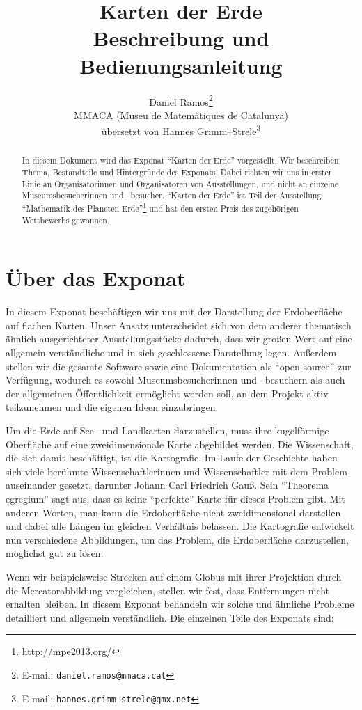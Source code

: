 \documentclass[a4paper,12pt]{article}
\title{Karten der Erde \\ Beschreibung und Bedienungsanleitung}
\author{Daniel Ramos\footnote{E-mail: \texttt{daniel.ramos@mmaca.cat}}
        \\MMACA (Museu de Matemàtiques de Catalunya)
        \\übersetzt von Hannes Grimm--Strele\footnote{E-mail: \texttt{hannes.grimm-strele@gmx.net}}}
\date{}
\begin{document}
\maketitle

\begin{abstract}
  In diesem Dokument wird das Exponat "`Karten der Erde"' vorgestellt.
  Wir beschreiben Thema, Bestandteile und Hintergründe des Exponats. 
  Dabei richten wir uns in erster Linie an Organisatorinnen und Organisatoren 
  von Ausstellungen, und nicht an einzelne Museumsbesucherinnen und --besucher. 
  "`Karten der Erde"' ist Teil der Ausstellung "`Mathematik des Planeten 
  Erde"'\footnote{\url{http://mpe2013.org/}} und hat den ersten Preis des 
  zugehörigen Wettbewerbs gewonnen.
\end{abstract}


\section{Über das Exponat}

In diesem Exponat beschäftigen wir uns mit der Darstellung der Erdoberfläche auf flachen 
Karten. Unser Ansatz unterscheidet sich von dem anderer thematisch ähnlich ausgerichteter
Ausstellungsstücke dadurch, dass wir großen Wert auf eine allgemein verständliche und 
in sich geschlossene Darstellung legen. Außerdem stellen wir die gesamte Software sowie 
eine Dokumentation als "`open source"' zur Verfügung, wodurch es sowohl 
Museumsbesucherinnen und --besuchern als auch der allgemeinen Öffentlichkeit ermöglicht 
werden soll, an dem Projekt aktiv teilzunehmen und die eigenen Ideen einzubringen.

Um die Erde auf See-- und Landkarten darzustellen, muss ihre kugelförmige Oberfläche 
auf eine zweidimensionale Karte abgebildet werden. Die Wissenschaft, die sich damit 
beschäftigt, ist die Kartografie. Im Laufe der Geschichte haben sich viele berühmte 
Wissenschaftlerinnen und Wissenschaftler mit dem Problem auseinander gesetzt, darunter 
Johann Carl Friedrich Gauß. Sein "`Theorema egregium"' sagt aus, dass es keine 
"`perfekte"' Karte für dieses Problem gibt. Mit anderen Worten, man kann die 
Erdoberfläche nicht zweidimensional darstellen und dabei alle Längen im gleichen 
Verhältnis belassen. Die Kartografie entwickelt nun verschiedene Abbildungen, um 
das Problem, die Erdoberfläche darzustellen, möglichst gut zu lösen.

Wenn wir beispielsweise Strecken auf einem Globus mit ihrer Projektion durch die 
Mercatorabbildung vergleichen, stellen wir fest, dass Entfernungen nicht erhalten 
bleiben. In diesem Exponat behandeln wir solche und ähnliche Probleme detailliert 
und allgemein verständlich. Die einzelnen Teile des Exponats sind:
\end{document}
